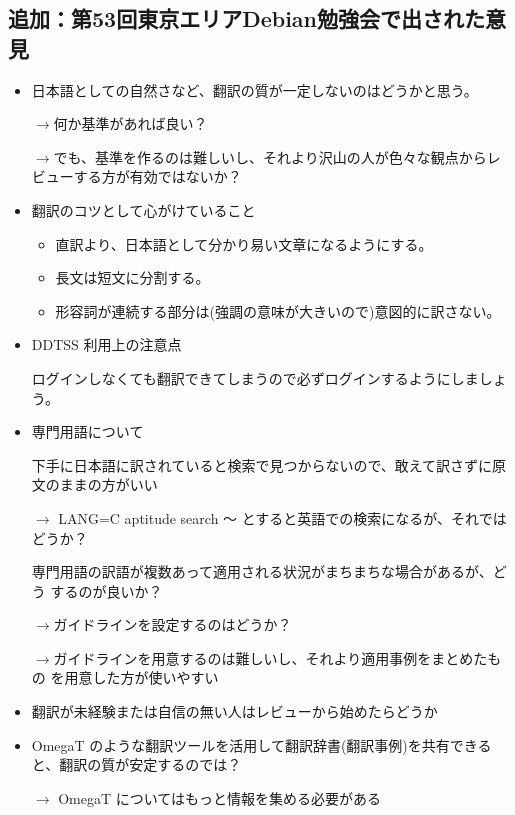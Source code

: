 \documentclass[mingoth,a4paper]{jsarticle}
\begin{document}
\subsection{追加：第53回東京エリアDebian勉強会で出された意見}
\begin{itemize}
 \item 日本語としての自然さなど、翻訳の質が一定しないのはどうかと思う。

 $\rightarrow$何か基準があれば良い？

 $\rightarrow$でも、基準を作るのは難しいし、それより沢山の人が色々な観点からレビューする方が有効ではないか？ 

 \item 翻訳のコツとして心がけていること

\begin{itemize}
 \item   直訳より、日本語として分かり易い文章になるようにする。

 \item  長文は短文に分割する。

 \item  形容詞が連続する部分は(強調の意味が大きいので)意図的に訳さない。 
\end{itemize}

 \item DDTSS 利用上の注意点

  ログインしなくても翻訳できてしまうので必ずログインするようにしましょう。

 \item 専門用語について

  下手に日本語に訳されていると検索で見つからないので、敢えて訳さずに原文のままの方がいい

  $\rightarrow$ LANG=C aptitude search 〜 とすると英語での検索になるが、それではどうか？ 

  専門用語の訳語が複数あって適用される状況がまちまちな場合があるが、どう
       するのが良いか？

       $\rightarrow$ガイドラインを設定するのはどうか？

       $\rightarrow$ガイドラインを用意するのは難しいし、それより適用事例をまとめたもの
       を用意した方が使いやすい


 \item 翻訳が未経験または自信の無い人はレビューから始めたらどうか

 \item OmegaT のような翻訳ツールを活用して翻訳辞書(翻訳事例)を共有できると、翻訳の質が安定するのでは？

  $\rightarrow$ OmegaT についてはもっと情報を集める必要がある

\end{itemize}
\end{document}
